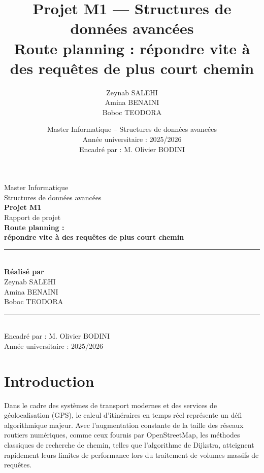 \documentclass[11pt]{article}
\title{Projet M1 --- Structures de données avancées\\[0.6cm]
\Huge Route planning : répondre vite à des requêtes de plus court chemin}
\author{
Zeynab SALEHI \\
Amina BENAINI \\
Boboc TEODORA
}
\date{
Master Informatique -- Structures de données avancées \\
Année universitaire : 2025/2026 \\
Encadré par : M. Olivier BODINI
}
\begin{document}
\begin{titlepage}
\thispagestyle{empty}
\begin{center}
\vspace*{1.5cm}

{\Large Master Informatique}\\[0.3cm]
{\large Structures de données avancées}\\[1.8cm]

{\Huge \textbf{Projet M1}}\\[0.6cm]
{\Large Rapport de projet}\\[1.8cm]

{\LARGE \textbf{Route planning :}}\\[0.3cm]
{\LARGE \textbf{répondre vite à des requêtes de plus court chemin}}\\[2.8cm]

\rule{0.8\linewidth}{0.6pt}\\[1.2cm]

{\large \textbf{Réalisé par}}\\[0.5cm]
{\Large Zeynab SALEHI}\\[0.25cm]
{\Large Amina BENAINI}\\[0.25cm]
{\Large Boboc TEODORA}\\[2cm]

\rule{0.8\linewidth}{0.6pt}\\[1.5cm]

{\large Encadré par : M. Olivier BODINI}\\[0.4cm]
{\large Année universitaire : 2025/2026}

\vfill
\end{center}
\end{titlepage}

\tableofcontents
\thispagestyle{empty}
\newpage

\section{Introduction}

Dans le cadre des systèmes de transport modernes et des services de géolocalisation (GPS), le calcul d'itinéraires en temps réel représente un défi algorithmique majeur. Avec l'augmentation constante de la taille des réseaux routiers numériques, comme ceux fournis par OpenStreetMap, les méthodes classiques de recherche de chemin, telles que l'algorithme de Dijkstra, atteignent rapidement leurs limites de performance lors du traitement de volumes massifs de requêtes.
\end{document}

